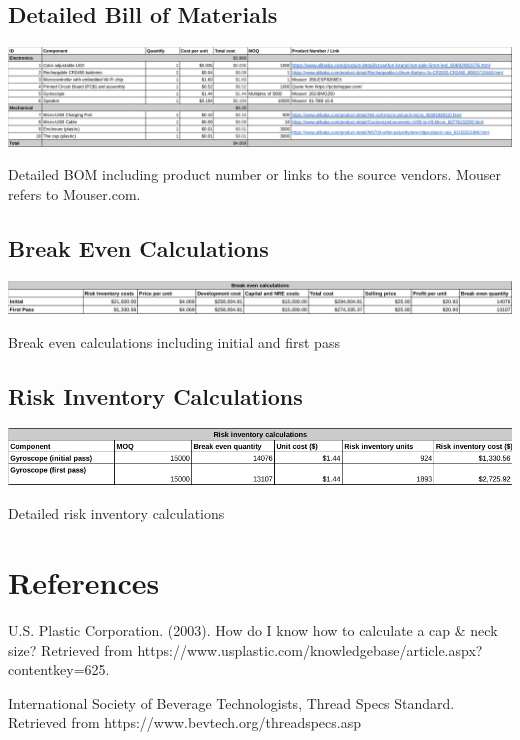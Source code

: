 \documentclass[12pt]{article}
\begin{document}
		\subsection*{Detailed Bill of Materials}
		\begin{table}[H]
			\includegraphics[width=\textwidth]{bom_large.png}
			
			\caption{Detailed BOM including product number or links to the source vendors. Mouser refers to Mouser.com.
			}
		\end{table}
		\subsection*{Break Even Calculations}
				\begin{table}[H]
			\includegraphics[width=\textwidth]{breakeven.png}
			
			\caption{ Break even calculations including initial and first pass}
		\end{table}
		\subsection*{Risk Inventory Calculations}
				\begin{table}[H]
			\includegraphics[width=\textwidth]{risk.png}
			\caption{Detailed risk inventory calculations}
		\end{table}
	
			
	\section*{References}
	\setlength{\parindent}{0pt}
	U.S. Plastic Corporation. (2003). How do I know how to calculate a cap \& neck size? Retrieved from https://www.usplastic.com/knowledgebase/article.aspx?contentkey=625. 
	
	International Society of Beverage Technologists, Thread Specs Standard. Retrieved from https://www.bevtech.org/threadspecs.asp
\end{document}
